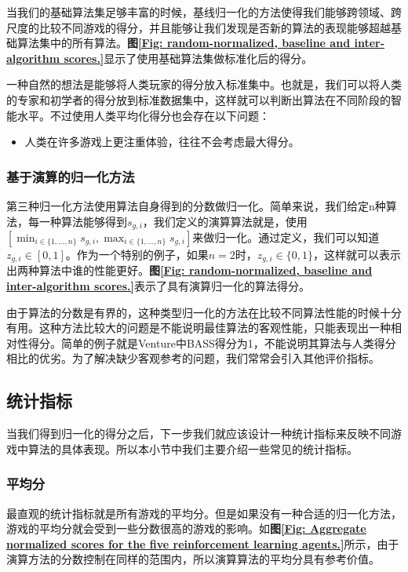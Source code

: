 当我们的基础算法集足够丰富的时候，基线归一化的方法使得我们能够跨领域、跨尺度的比较不同游戏的得分，并且能够让我们发现是否新的算法的表现能够超越基础算法集中的所有算法。\textbf{图\ref{Fig: random-normalized, baseline and inter-algorithm scores.}}显示了使用基础算法集做标准化后的得分。

一种自然的想法是能够将人类玩家的得分放入标准集中。也就是，我们可以将人类的专家和初学者的得分放到标准数据集中，这样就可以判断出算法在不同阶段的智能水平。不过使用人类平均化得分也会存在以下问题：
\begin{itemize}
    \item 人类在许多游戏上更注重体验，往往不会考虑最大得分。
\end{itemize}

\subsubsection{基于演算的归一化方法}
第三种归一化方法使用算法自身得到的分数做归一化。简单来说，我们给定n种算法，每一种算法能够得到$s_{g,i}$，我们定义的演算算法就是，使用$\left[\min _{i \in\{1, \ldots, n\}} s_{g, i}, \max _{i \in\{1, \ldots, n\}} s_{g, i}\right]$来做归一化。通过定义，我们可以知道$z_{g, i} \in[0,1]$。作为一个特别的例子，如果$n=2$时，$z_{g, i} \in\{0,1\}$，这样就可以表示出两种算法中谁的性能更好。\textbf{图\ref{Fig: random-normalized, baseline and inter-algorithm scores.}}表示了具有演算归一化的算法得分。

由于算法的分数是有界的，这种类型归一化的方法在比较不同算法性能的时候十分有用。这种方法比较大的问题是不能说明最佳算法的客观性能，只能表现出一种相对性得分。简单的例子就是Venture中BASS得分为1，不能说明其算法与人类得分相比的优劣。为了解决缺少客观参考的问题，我们常常会引入其他评价指标。

\subsection{统计指标}
当我们得到归一化的得分之后，下一步我们就应该设计一种统计指标来反映不同游戏中算法的具体表现。所以本小节中我们主要介绍一些常见的统计指标。



\subsubsection{平均分}
最直观的统计指标就是所有游戏的平均分。但是如果没有一种合适的归一化方法，游戏的平均分就会受到一些分数很高的游戏的影响。如\textbf{图\ref{Fig: Aggregate normalized scores for the five reinforcement learning agents.}}所示，由于演算方法的分数控制在同样的范围内，所以演算算法的平均分具有参考价值。



